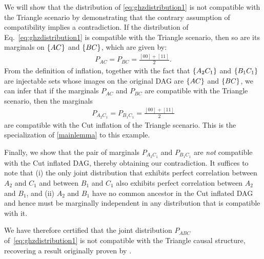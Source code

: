We will show that the distribution of \cref{eq:ghzdistribution1} is not compatible with the Triangle scenario by demonstrating that the contrary assumption of compatibility implies a contradiction. If the distribution of Eq.~\eqref{eq:ghzdistribution1} is compatible with the Triangle scenario, then so are its marginals on $\left\lbrace AC\right\rbrace$ and $\left\lbrace BC\right\rbrace$, which are given by:
\begin{align*}
P_{A C} = P_{B C} = \frac{[00]+[11]}{2}.
\end{align*}
From the definition of inflation, together with the fact that $\left\lbrace A_2 C_1\right\rbrace$ and $\left\lbrace B_1 C_1\right\rbrace$ are injectable sets whose images on the original DAG are $\left\lbrace AC\right\rbrace$ and $\left\lbrace BC\right\rbrace$, we can infer that if the marginals $P_{A C}$ and $P_{B C}$ are compatible with the Triangle scenario, then the marginals 
\begin{align}\label{ghzmarginals}
P_{A_2 C_1} = P_{B_1 C_1} = \frac{[00]+[11]}{2}
\end{align}
are compatible with the Cut inflation of the Triangle scenario.  This is the specialization of \cref{mainlemma} to this example.  

Finally, we show that the pair of marginals $P_{A_2 C_1}$ and $P_{B_1 C_1}$ are \emph{not} compatible with the Cut inflated DAG, thereby obtaining our contradiction.  It suffices to note that (i) the only joint distribution that exhibits perfect correlation between $A_2$ and $C_1$ and between $B_1$ and $C_1$ also exhibits perfect correlation between $A_2$ and $B_1$, and (ii) $A_2$ and $B_1$ have no common ancestor in the Cut inflated DAG and hence must be marginally independent in any distribution that is compatible with it. 


We have therefore certified that the joint distribution $P_{A B C}$ of~\cref{eq:ghzdistribution1} is not compatible with the Triangle causal structure, recovering a result originally proven by \citet{steudel2010ancestors}.

